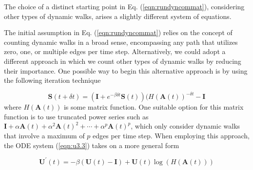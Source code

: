 \begin{highlightedParagraphC}
 
The choice of a distinct starting point in Eq. (\ref{eqn:rundyncommat}), considering other types of dynamic walks, arises a slightly different system of equations.

\end{highlightedParagraphC}

The initial assumption in Eq. (\ref{eqn:rundyncommat}) relies on the concept of counting dynamic walks in a broad sense, encompassing any path that utilizes zero, one, or multiple edges per time step. Alternatively, we could adopt a different approach in which we count other types of dynamic walks by reducing their importance. One possible way to begin this alternative approach is by using the following iteration technique

\begin{equation}
\label{eqn:remarks1}
    \mathbf{S}(t + \delta t) = (\mathbf{I} + e^{-\beta\delta t}\mathbf{S}(t)) (H(\mathbf{A}(t))^{-\delta t} - \mathbf{I}
\end{equation}
where $H(\mathbf{A}(t))$ is some matrix function. One suitable option for this matrix function is to use truncated power series such as $\mathbf{I} + \alpha \mathbf{A}(t) + \alpha^2 \mathbf{A}(t)^2 + \cdots + \alpha^p \mathbf{A}(t)^p$, which only consider dynamic walks that involve a maximum of $p$ edges per time step. When employing this approach, the ODE system (\ref{eqn:u3.3}) takes on a more general form 

\begin{equation}
\label{eqn:remarks2}
    \mathbf{U^{\prime}}(t) = -\beta (\mathbf{U}(t) - \mathbf{I}) + \mathbf{U}(t)\log (H(\mathbf{A}(t)))
\end{equation}








